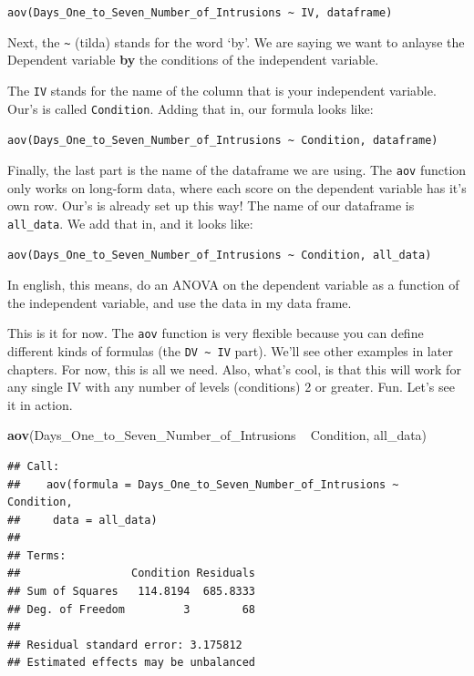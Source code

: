 \documentclass[]{book}
\newenvironment{Shaded}{\begin{snugshade}}{\end{snugshade}}
\newcommand{\KeywordTok}[1]{\textcolor[rgb]{0.13,0.29,0.53}{\textbf{{#1}}}}
\newcommand{\StringTok}[1]{\textcolor[rgb]{0.31,0.60,0.02}{{#1}}}
\newcommand{\NormalTok}[1]{{#1}}
\theoremstyle{definition}
\theoremstyle{definition}
\theoremstyle{definition}
\theoremstyle{remark}
\begin{document}
\texttt{aov(Days\_One\_to\_Seven\_Number\_of\_Intrusions\ \textasciitilde{}\ IV,\ dataframe)}

Next, the \texttt{\textasciitilde{}} (tilda) stands for the word `by'.
We are saying we want to anlayse the Dependent variable \textbf{by} the
conditions of the independent variable.

The \texttt{IV} stands for the name of the column that is your
independent variable. Our's is called \texttt{Condition}. Adding that
in, our formula looks like:

\texttt{aov(Days\_One\_to\_Seven\_Number\_of\_Intrusions\ \textasciitilde{}\ Condition,\ dataframe)}

Finally, the last part is the name of the dataframe we are using. The
\texttt{aov} function only works on long-form data, where each score on
the dependent variable has it's own row. Our's is already set up this
way! The name of our dataframe is \texttt{all\_data}. We add that in,
and it looks like:

\texttt{aov(Days\_One\_to\_Seven\_Number\_of\_Intrusions\ \textasciitilde{}\ Condition,\ all\_data)}

In english, this means, do an ANOVA on the dependent variable as a
function of the independent variable, and use the data in my data frame.

This is it for now. The \texttt{aov} function is very flexible because
you can define different kinds of formulas (the
\texttt{DV\ \textasciitilde{}\ IV} part). We'll see other examples in
later chapters. For now, this is all we need. Also, what's cool, is that
this will work for any single IV with any number of levels (conditions)
2 or greater. Fun. Let's see it in action.

\begin{Shaded}
\begin{Highlighting}[]
\KeywordTok{aov}\NormalTok{(Days_One_to_Seven_Number_of_Intrusions ~}\StringTok{ }\NormalTok{Condition, all_data)}
\end{Highlighting}
\end{Shaded}

\begin{verbatim}
## Call:
##    aov(formula = Days_One_to_Seven_Number_of_Intrusions ~ Condition, 
##     data = all_data)
## 
## Terms:
##                 Condition Residuals
## Sum of Squares   114.8194  685.8333
## Deg. of Freedom         3        68
## 
## Residual standard error: 3.175812
## Estimated effects may be unbalanced
\end{verbatim}
\end{document}
